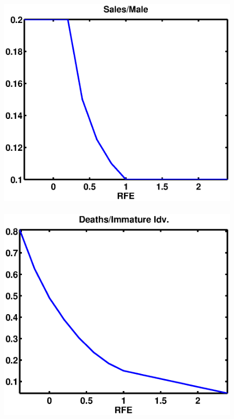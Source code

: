 \documentclass[mathserif]{beamer}
\begin{document}
\begin{frame}
\begin{center}
\frametitle{\insertsubsection}
\includegraphics[width=0.9\textwidth]{salemale}
\end{center}
\end{frame}

\begin{frame}
\begin{center}
\frametitle{\insertsubsection}
\includegraphics[width=0.9\textwidth]{mortMat}
\end{center}
\end{frame}
\end{document}
